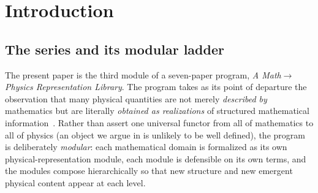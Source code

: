 \documentclass[12pt]{article}
\theoremstyle{definition}
\theoremstyle{remark}
\begin{document}
\tableofcontents

\section{Introduction}
\label{sec:intro}

\subsection{The series and its modular ladder}

The present paper is the third module of a seven-paper program, \emph{A Math$\to$Physics
Representation Library}. The program takes as its point of departure the observation that many
physical quantities are not merely \emph{described by} mathematics but are literally \emph{obtained
as realizations} of structured mathematical information~\cite{primary}. Rather than assert one
universal functor from all of mathematics to all of physics (an object we argue in
 is unlikely to be well defined), the program is deliberately
\emph{modular}: each mathematical domain is formalized as its own physical-representation module,
each module is defensible on its own terms, and the modules compose hierarchically so that new
structure and new emergent physical content appear at each level.
\end{document}
